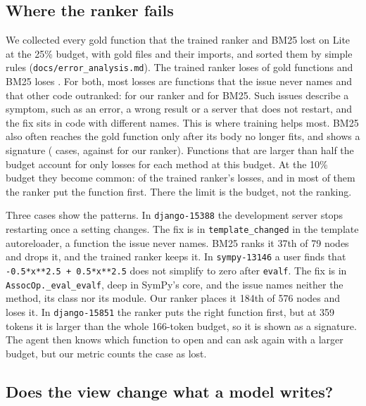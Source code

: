 \subsection{Where the ranker fails}

We collected every gold function that the trained ranker and BM25 lost on Lite at the 25\% budget, with gold files and their imports, and sorted them by simple rules (\texttt{docs/error\_analysis.md}). The trained ranker loses  of  gold functions and BM25 loses . For both, most losses are functions that the issue never names and that other code outranked:  for our ranker and  for BM25. Such issues describe a symptom, such as an error, a wrong result or a server that does not restart, and the fix sits in code with different names. This is where training helps most. BM25 also often reaches the gold function only after its body no longer fits, and shows a signature ( cases, against  for our ranker). Functions that are larger than half the budget account for only  losses for each method at this budget. At the 10\% budget they become common:  of the trained ranker's  losses, and in most of them the ranker put the function first. There the limit is the budget, not the ranking.

Three cases show the patterns. In \texttt{django-15388} the development server stops restarting once a setting changes. The fix is in \texttt{template\_changed} in the template autoreloader, a function the issue never names. BM25 ranks it 37th of 79 nodes and drops it, and the trained ranker keeps it. In \texttt{sympy-13146} a user finds that \texttt{-0.5*x**2.5 + 0.5*x**2.5} does not simplify to zero after \texttt{evalf}. The fix is in \texttt{AssocOp.\_eval\_evalf}, deep in SymPy's core, and the issue names neither the method, its class nor its module. Our ranker places it 184th of 576 nodes and loses it. In \texttt{django-15851} the ranker puts the right function first, but at 359 tokens it is larger than the whole 166-token budget, so it is shown as a signature. The agent then knows which function to open and can ask again with a larger budget, but our metric counts the case as lost.

\subsection{Does the view change what a model writes?}
\label{sec:downstream}

